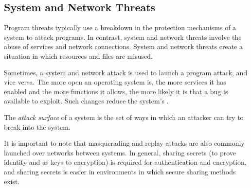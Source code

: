 \subsection{System and Network Threats}\label{subsec:System_Network_Threats}
Program threats typically use a breakdown in the protection mechanisms of a system to attack programs.
In contrast, system and network threats involve the abuse of services and network connections.
System and network threats create a situation in which  resources and  files are misused.

Sometimes, a system and network attack is used to launch a program attack, and vice versa.
The more open an operating system is, the more services it has enabled and the more functions it allows, the more likely it is that a bug is available to exploit.
Such changes reduce the system’s .

\begin{definition}\label{def:Attack_Surface}
  The \emph{attack surface} of a system is the set of ways in which an attacker can try to break into the system.
\end{definition}

It is important to note that masquerading and replay attacks are also commonly launched over networks between systems.
In general, sharing secrets (to prove identity and as keys to encryption) is required for authentication and encryption, and sharing secrets is easier in environments in which secure sharing methods exist.


